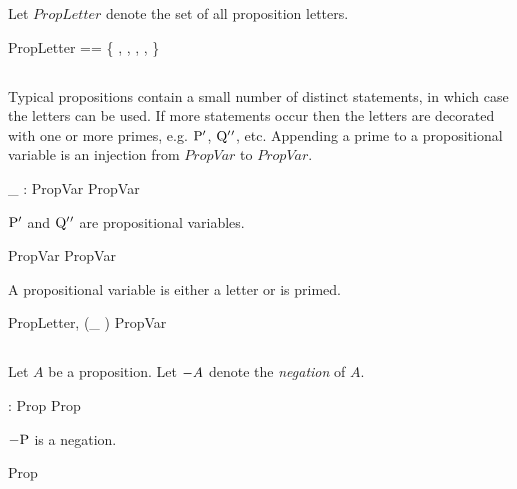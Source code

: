 \documentclass[11pt, oneside]{article}
\begin{document}
Let $PropLetter$ denote the set of all proposition letters.

\begin{zed}
	PropLetter == \{ \propP, \propQ, \propR, \propS, \propT \}
\end{zed}

\subsection{}

Typical propositions contain a small number of distinct statements, in which case the letters can be used.
If more statements occur then the letters are decorated with one or more primes, 
e.g. $\mathrm{P} {'}$, $\mathrm{Q} {'} {'}$, etc.
Appending a prime to a propositional variable is an injection from $PropVar$ to $PropVar$.

\begin{axdef}
	\_ \propPrime: PropVar \inj PropVar
\end{axdef}

\begin{example}
$\mathrm{P} {'}$ and $\mathrm{Q} {'} {'}$ are propositional variables.
\begin{zed}
	\propP \propPrime \in PropVar
\also
	\propQ \propPrime \propPrime \in PropVar
\end{zed}

\end{example}

A propositional variable is either a letter or is primed.

\begin{zed}
	\langle PropLetter, \ran (\_ \propPrime) \rangle \partition PropVar
\end{zed}

\subsection{}

Let $A$ be a proposition.
Let $- A$ denote the {\it negation} of $A$.

\begin{axdef}
	\notProp: Prop \inj Prop
\end{axdef}

\begin{example}
$- \mathrm{P}$ is a negation.

\begin{zed}
	\notProp \propP \in Prop
\end{zed}

\end{example}
\end{document}
